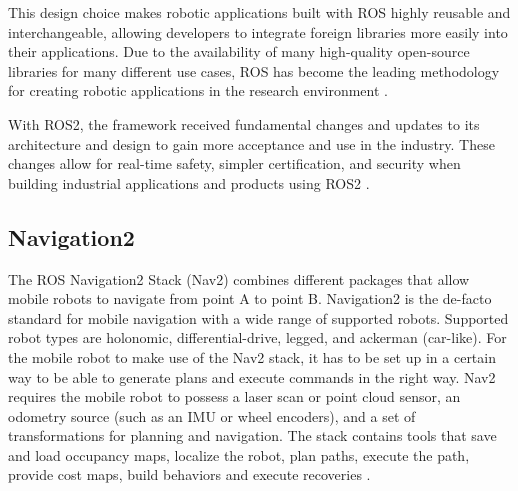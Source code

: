 This design choice makes robotic applications built with ROS highly reusable and interchangeable, allowing developers to integrate foreign libraries more easily into their applications. 
Due to the availability of many high-quality open-source libraries for many different use cases, ROS has become the leading methodology for creating robotic applications in the research environment \cite{quigley2009}. 

With ROS2, the framework received fundamental changes and updates to its architecture and design to gain more acceptance and use in the industry. These changes allow for real-time safety, simpler certification, and security when building industrial applications and products using ROS2 \cite{ros2022}. 

\subsection{Navigation2}
The ROS Navigation2 Stack (Nav2) combines different packages that allow mobile robots to navigate from point A to point B. Navigation2 is the de-facto standard for mobile navigation with a wide range of supported robots. Supported robot types are holonomic, differential-drive, legged, and ackerman (car-like). For the mobile robot to make use of the Nav2 stack, it has to be set up in a certain way to be able to generate plans and execute commands in the right way. Nav2 requires the mobile robot to possess a laser scan or point cloud sensor, an odometry source (such as an IMU or wheel encoders), and a set of transformations for planning and navigation. 
The stack contains tools that save and load occupancy maps, localize the robot, plan paths, execute the path, provide cost maps, build behaviors and execute recoveries \cite{macenski2020}. 

